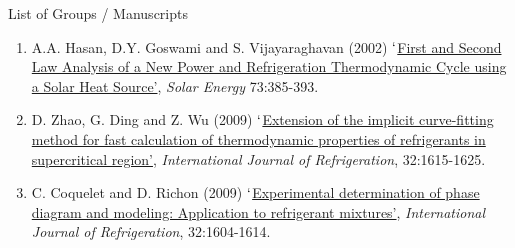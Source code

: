 \documentclass[12pts,a4paper]{report}%
\begin{document}
\clearpage

\begin{center}
{\Large List of Groups / Manuscripts}
\end{center}


\begin{enumerate}[label=\bfseries Group \arabic*:]
%
\item A.A. Hasan, D.Y. Goswami and S. Vijayaraghavan (2002) \href{http://dx.doi.org/10.1016/S0038-092X(02)00113-5}{$\lq$First and Second Law Analysis of a New Power and Refrigeration Thermodynamic Cycle using a Solar Heat Source'}, {\it Solar Energy} 73:385-393.
%
\item D. Zhao, G. Ding and Z. Wu (2009) \href{http://dx.doi.org/10.1016/j.ijrefrig.2009.05.005}{$\lq$Extension of the implicit curve-fitting method for fast calculation of thermodynamic properties of refrigerants in supercritical region'}, {\it International Journal of Refrigeration}, 32:1615-1625.
%
\item C. Coquelet and D. Richon (2009) \href{http://dx.doi.org/10.1016/j.ijrefrig.2009.03.013}{$\lq$Experimental determination of phase diagram and modeling: Application to refrigerant mixtures'}, {\it International Journal of Refrigeration}, 32:1604-1614.


\end{enumerate}
\end{document}
